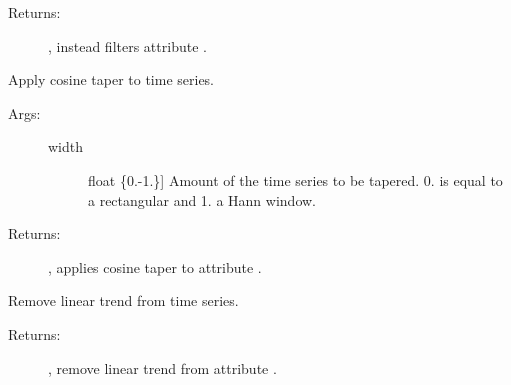 \documentclass[letterpaper,10pt,english,openany,oneside]{sphinxmanual}
\begin{document}
\begin{fulllineitems}
\begin{fulllineitems}
\begin{description}
\item[{Returns:}] \leavevmode
{}, instead filters attribute .

\end{description}

\end{fulllineitems}


\begin{fulllineitems}
\label{\detokenize{index:sigpropy.TimeSeries.cosine_taper}}
Apply cosine taper to time series.
\begin{description}
\item[{Args:}] \leavevmode\begin{description}
\item[{width}] \leavevmode{[}float \{0.-1.\}{]}
Amount of the time series to be tapered.
0. is equal to a rectangular and 1. a Hann window.

\end{description}

\item[{Returns:}] \leavevmode
{}, applies cosine taper to attribute .

\end{description}

\end{fulllineitems}


\begin{fulllineitems}
\label{\detokenize{index:sigpropy.TimeSeries.detrend}}
Remove linear trend from time series.
\begin{description}
\item[{Returns:}] \leavevmode
{}, remove linear trend from attribute .

\end{description}

\end{fulllineitems}



\end{fulllineitems}
\end{document}
